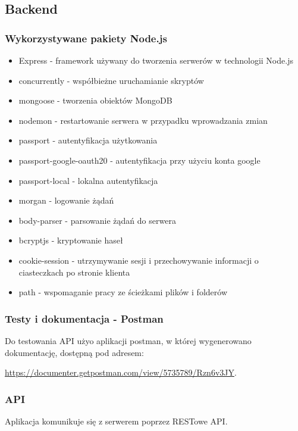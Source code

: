\documentclass{sprawozdanie-agh}
\begin{document}
		\subsection{Backend}
		\subsubsection{Wykorzystywane pakiety Node.js}
		\begin{itemize}
			\item Express - framework używany do tworzenia serwerów w technologii Node.js
			\item concurrently - współbieżne uruchamianie skryptów
			\item mongoose - tworzenia obiektów MongoDB  
			\item nodemon - restartowanie serwera w przypadku wprowadzania zmian
			\item passport - autentyfikacja użytkowania
			\item passport-google-oauth20 - autentyfikacja przy użyciu konta google
			\item passport-local - lokalna autentyfikacja 
			\item morgan - logowanie żądań 
			\item body-parser - parsowanie żądań do serwera 
			\item bcryptjs - kryptowanie haseł
			\item cookie-session - utrzymywanie sesji i przechowywanie informacji o ciasteczkach po stronie klienta
			\item path - wspomaganie pracy ze ścieżkami plików i folderów	
		\end{itemize}
		\subsubsection{Testy i dokumentacja - Postman}
		Do testowania API użyo aplikacji postman, w której wygenerowano dokumentację, dostępną pod adresem:

		\href{https://documenter.getpostman.com/view/5735789/Rzn6v3JY}{		https://documenter.getpostman.com/view/5735789/Rzn6v3JY}.

		\subsubsection{API}

			Aplikacja komunikuje się z serwerem poprzez RESTowe API.
			
\end{document}
